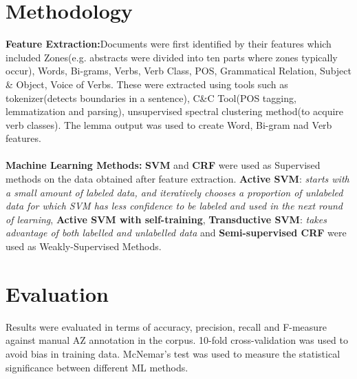\documentclass{article}
\begin{document}
\section{Methodology}
\textbf{Feature Extraction:}Documents were first identified by their features which included Zones(e.g. abstracts were divided into ten parts where zones typically occur), Words, Bi-grams, Verbs, Verb Class, POS, Grammatical Relation, Subject \& Object, Voice of Verbs. These were extracted using tools such as tokenizer(detects boundaries in a sentence), C\&C Tool(POS tagging, lemmatization and parsing), unsupervised spectral clustering method(to acquire verb classes). The lemma output was used to create Word, Bi-gram nad Verb features.\\ \\
\textbf{Machine Learning Methods:} \textbf{SVM} and \textbf{CRF} were used as Supervised methods on the data obtained after feature extraction. \textbf{Active SVM}: \emph{starts with a small amount of labeled data, and iteratively chooses a proportion of unlabeled data for which SVM has less confidence to be labeled and used in the next round of learning}, \textbf{Active SVM with self-training}, \textbf{Transductive SVM}: \emph{takes advantage of both labelled and unlabelled data} and \textbf{Semi-supervised CRF} were used as Weakly-Supervised Methods.

\section{Evaluation}
Results were evaluated in terms of accuracy, precision, recall and F-measure against manual AZ annotation in the corpus. 10-fold cross-validation was used to avoid bias in training data. McNemar's test was used to measure the statistical significance between different ML methods.
\end{document}
